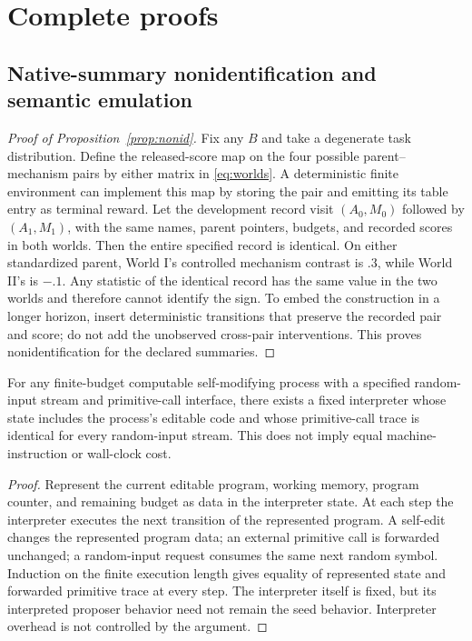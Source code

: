 \section{Complete proofs}\label{app:proofs}
\subsection{Native-summary nonidentification and semantic emulation}
\begin{proof}[Proof of Proposition~\ref{prop:nonid}]
Fix any $B$ and take a degenerate task distribution. Define the released-score map on the four possible parent--mechanism pairs by either matrix in \eqref{eq:worlds}. A deterministic finite environment can implement this map by storing the pair and emitting its table entry as terminal reward. Let the development record visit $(A_0,M_0)$ followed by $(A_1,M_1)$, with the same names, parent pointers, budgets, and recorded scores in both worlds. Then the entire specified record is identical. On either standardized parent, World I's controlled mechanism contrast is $.3$, while World II's is $-.1$. Any statistic of the identical record has the same value in the two worlds and therefore cannot identify the sign. To embed the construction in a longer horizon, insert deterministic transitions that preserve the recorded pair and score; do not add the unobserved cross-pair interventions. This proves nonidentification for the declared summaries.
\end{proof}

\begin{proposition}\label{prop:emulation}
For any finite-budget computable self-modifying process with a specified random-input stream and primitive-call interface, there exists a fixed interpreter whose state includes the process's editable code and whose primitive-call trace is identical for every random-input stream. This does not imply equal machine-instruction or wall-clock cost.
\end{proposition}
\begin{proof}
Represent the current editable program, working memory, program counter, and remaining budget as data in the interpreter state. At each step the interpreter executes the next transition of the represented program. A self-edit changes the represented program data; an external primitive call is forwarded unchanged; a random-input request consumes the same next random symbol. Induction on the finite execution length gives equality of represented state and forwarded primitive trace at every step. The interpreter itself is fixed, but its interpreted proposer behavior need not remain the seed behavior. Interpreter overhead is not controlled by the argument.
\end{proof}


